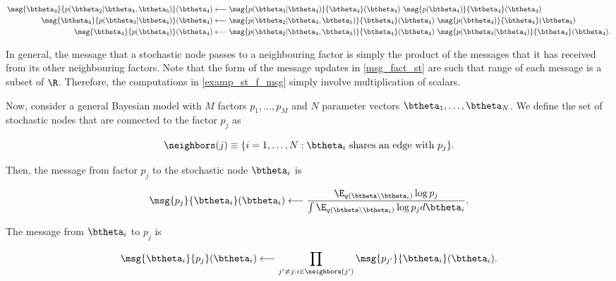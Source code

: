 \documentclass[12pt]{article}
\theoremstyle{plain}
\theoremstyle{definition}
\theoremstyle{remark}
\begin{document}
\begin{align}
\begin{split}
	\msg{\btheta_4}{p (\btheta_2 | \btheta_4, \btheta_5)} (\btheta_4)
		&\longleftarrow
			\msg{p (\btheta_3 | \btheta_4)}{\btheta_4} (\btheta_4) \
			\msg{p(\btheta_4)}{\btheta_4} (\btheta_4) \\
	\msg{\btheta_4}{p (\btheta_3 | \btheta_4)} (\btheta_4)
		&\longleftarrow
			\msg{p (\btheta_2 | \btheta_4, \btheta_5)}{\btheta_4} (\btheta_4) \
			\msg{p (\btheta_4)}{\btheta_4} (\btheta_4) \\
	\msg{\btheta_4}{p (\btheta_4)} (\btheta_4)
		&\longleftarrow
			\msg{p (\btheta_2 | \btheta_4, \btheta_5)}{\btheta_4} (\btheta_4) \
			\msg{p (\btheta_3 | \btheta_4)}{\btheta_4} (\btheta_4).
\end{split}
\label{examp_st_f_msg}
\end{align}

\noindent In general, the message that a stochastic node passes to a neighbouring factor is simply the product
of the messages that it has received from its other neighbouring factors. Note that the form of the message
updates in \eqref{msg_fact_st} are such that range of each message is a subset of $\R$. Therefore, the computations
in \eqref{examp_st_f_msg} simply involve multiplication of scalars.

Now, consider a general Bayesian model with $M$ factors $p_1, \dots, p_M$ and $N$ parameter vectors
$\btheta_1, \dots, \btheta_N$. We define the set of stochastic nodes that are connected to the factor
$p_j$ as

\[
	\neighbors (j) \equiv \{ i = 1, \dots, N: \text{$\btheta_i$ shares an edge with $p_j$} \}.
\]

\noindent Then, the message from factor
$p_j$ to the stochastic node $\btheta_i$ is

\begin{equation}
	\msg{p_j}{\btheta_i} (\btheta_i)
		\longleftarrow
			\frac{
				\E_{q(\btheta \setminus \btheta_i)} \log p_j
			} {
				\int \E_{q(\btheta \setminus \btheta_i)} \log p_j d\btheta_i
			}.
\label{msg_fact_sn}
\end{equation}

\noindent The message from $\btheta_i$ to $p_j$ is

\begin{equation}
	\msg{\btheta_i}{p_j} (\btheta_i)
		\longleftarrow
			\prod_{j' \neq j : i \in \neighbors(j')} \msg{p_{j'}}{\btheta_i} (\btheta_i).
\label{msg_sn_fact}
\end{equation}
\end{document}
